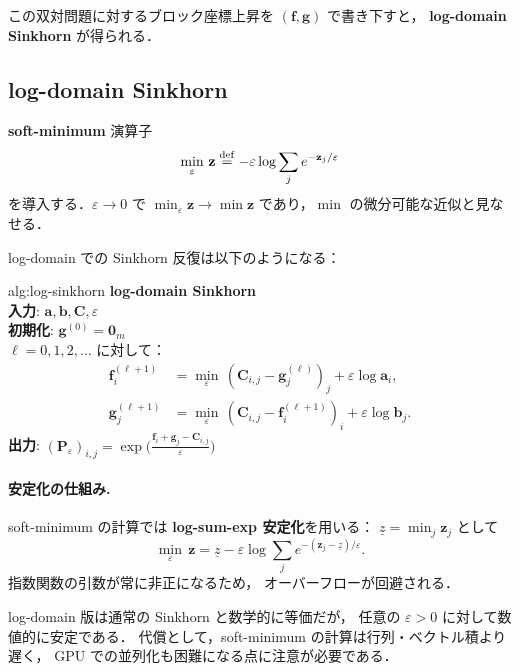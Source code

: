 この双対問題に対するブロック座標上昇を
$(\mathbf{f}, \mathbf{g})$ で書き下すと，
\textbf{log-domain Sinkhorn} が得られる．

\subsection{log-domain Sinkhorn}\label{subsec:log-domain-sinkhorn}

\textbf{soft-minimum} 演算子
\begin{equation}\label{eq:softmin}
  \min_\varepsilon\, \mathbf{z}
  \overset{\mathrm{def}}{=} -\varepsilon \log \sum_j e^{-\mathbf{z}_j / \varepsilon}
\end{equation}
を導入する．$\varepsilon \to 0$ で $\min_\varepsilon \mathbf{z} \to \min \mathbf{z}$
であり，$\min$ の微分可能な近似と見なせる．

log-domain での Sinkhorn 反復は以下のようになる：

\begin{algorithm}{alg:log-sinkhorn}
\textbf{log-domain Sinkhorn} \\[4pt]
\textbf{入力}: $\mathbf{a}, \mathbf{b}, \mathbf{C}, \varepsilon$ \\
\textbf{初期化}: $\mathbf{g}^{(0)} = \mathbf{0}_m$ \\[2pt]
$\ell = 0, 1, 2, \ldots$ に対して：
\begin{align*}
  \mathbf{f}^{(\ell+1)}_i &=
  \min_\varepsilon\, (\mathbf{C}_{i,j} - \mathbf{g}^{(\ell)}_j)_j
  + \varepsilon \log \mathbf{a}_i, \\
  \mathbf{g}^{(\ell+1)}_j &=
  \min_\varepsilon\, (\mathbf{C}_{i,j} - \mathbf{f}^{(\ell+1)}_i)_i
  + \varepsilon \log \mathbf{b}_j.
\end{align*}
\textbf{出力}: $(\mathbf{P}_\varepsilon)_{i,j}
= \exp\bigl(\frac{\mathbf{f}_i + \mathbf{g}_j - \mathbf{C}_{i,j}}{\varepsilon}\bigr)$
\end{algorithm}

\paragraph{安定化の仕組み.}
soft-minimum の計算では
\textbf{log-sum-exp 安定化}を用いる：
$\underline{z} = \min_j \mathbf{z}_j$ として
\[
  \min_\varepsilon\, \mathbf{z}
  = \underline{z} - \varepsilon \log \sum_j e^{-(\mathbf{z}_j - \underline{z})/\varepsilon}.
\]
指数関数の引数が常に非正になるため，
オーバーフローが回避される．

log-domain 版は通常の Sinkhorn と数学的に等価だが，
任意の $\varepsilon > 0$ に対して数値的に安定である．
代償として，soft-minimum の計算は行列・ベクトル積より遅く，
GPU での並列化も困難になる点に注意が必要である．


